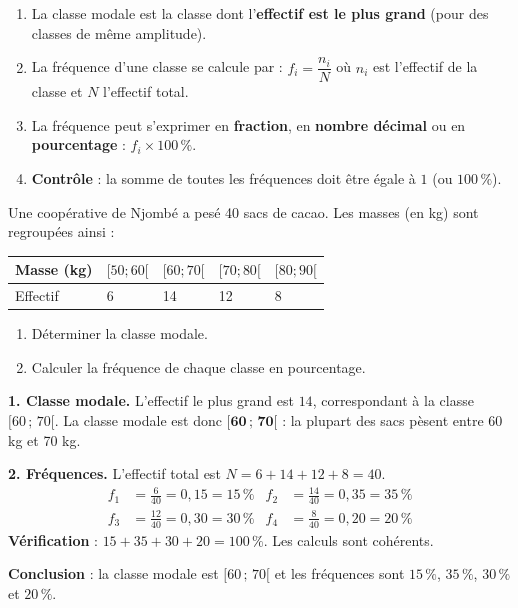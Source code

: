 \documentclass[11pt]{article}
\newcommand{\cle}[1]{{\popxbold\color{popdark}#1}}
\begin{document}
\begin{methode}
\begin{enumerate}
\item La \cle{classe modale} est la classe dont l'\textbf{effectif est le plus grand} (pour des classes de même amplitude).
\item La \cle{fréquence} d'une classe se calcule par : $f_i = \dfrac{n_i}{N}$ où $n_i$ est l'effectif de la classe et $N$ l'effectif total.
\item La fréquence peut s'exprimer en \textbf{fraction}, en \textbf{nombre décimal} ou en \textbf{pourcentage} : $f_i \times 100\,\%$.
\item \textbf{Contrôle} : la somme de toutes les fréquences doit être égale à $1$ (ou $100\,\%$).
\end{enumerate}
\end{methode}

\begin{exoresolu}
Une coopérative de Njombé a pesé 40 sacs de cacao. Les masses (en kg) sont regroupées ainsi :
\begin{center}
\begin{tabularx}{\linewidth}{|l|X|X|X|X|}\hline
\rowcolor{popblueL} Masse (kg) & $[50;60[$ & $[60;70[$ & $[70;80[$ & $[80;90[$ \\ \hline
Effectif & 6 & 14 & 12 & 8 \\ \hline
\end{tabularx}
\end{center}
\begin{enumerate}
\item Déterminer la classe modale.
\item Calculer la fréquence de chaque classe en pourcentage.
\end{enumerate}
\tcblower
\textbf{1. Classe modale.} L'effectif le plus grand est $14$, correspondant à la classe $[60\,;\,70[$. La classe modale est donc $\mathbf{[60\,;\,70[}$ : la plupart des sacs pèsent entre 60 kg et 70 kg.

\textbf{2. Fréquences.} L'effectif total est $N = 6 + 14 + 12 + 8 = 40$.
\begin{align*}
f_1 &= \frac{6}{40} = 0{,}15 = 15\,\% &
f_2 &= \frac{14}{40} = 0{,}35 = 35\,\% \\
f_3 &= \frac{12}{40} = 0{,}30 = 30\,\% &
f_4 &= \frac{8}{40} = 0{,}20 = 20\,\%
\end{align*}
\textbf{Vérification} : $15 + 35 + 30 + 20 = 100\,\%$. Les calculs sont cohérents.

\textbf{Conclusion} : la classe modale est $[60\,;\,70[$ et les fréquences sont $15\,\%$, $35\,\%$, $30\,\%$ et $20\,\%$.
\end{exoresolu}
\end{document}
